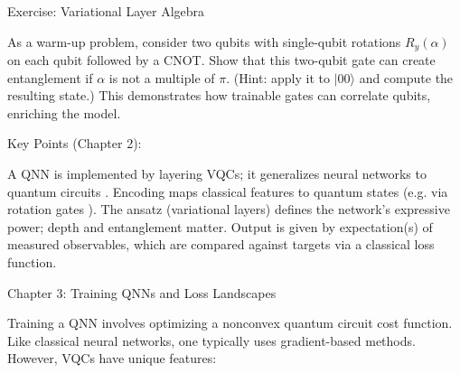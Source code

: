 Exercise: Variational Layer Algebra





As a warm-up problem, consider two qubits with single-qubit rotations $R_y(\alpha)$ on each qubit followed by a CNOT. Show that this two-qubit gate can create entanglement if $\alpha$ is not a multiple of $\pi$.  (Hint: apply it to $|00\rangle$ and compute the resulting state.)  This demonstrates how trainable gates can correlate qubits, enriching the model.



Key Points (Chapter 2):



A QNN is implemented by layering VQCs; it generalizes neural networks to quantum circuits .
Encoding maps classical features to quantum states (e.g. via rotation gates ).
The ansatz (variational layers) defines the network’s expressive power; depth and entanglement matter.
Output is given by expectation(s) of measured observables, which are compared against targets via a classical loss function.






Chapter 3: Training QNNs and Loss Landscapes





Training a QNN involves optimizing a nonconvex quantum circuit cost function.  Like classical neural networks, one typically uses gradient-based methods.  However, VQCs have unique features:



